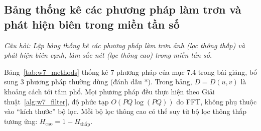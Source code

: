 \subsection{Bảng thống kê các phương pháp làm trơn và phát hiện biên trong miền tần số}
\label{subsec:w7_table}

\textit{Câu hỏi: Lập bảng thống kê các phương pháp làm trơn ảnh (lọc thông thấp) và phát hiện biên cạnh, làm sắc nét (lọc thông cao) trong miền tần số.}

Bảng~\ref{tab:w7_methods} thống kê $7$ phương pháp của mục 7.4 trong bài giảng, bổ sung $3$ phương pháp thường dùng (đánh dấu *). Trong bảng, $D = D(u, v)$ là khoảng cách tới tâm phổ. Mọi phương pháp đều thực hiện theo Giải thuật~\ref{alg:w7_filter}, độ phức tạp $O(PQ\log(PQ))$ do FFT, không phụ thuộc vào ``kích thước'' bộ lọc. Mỗi bộ lọc thông cao có thể suy từ bộ lọc thông thấp tương ứng: $H_{\text{cao}} = 1 - H_{\text{thấp}}$.

